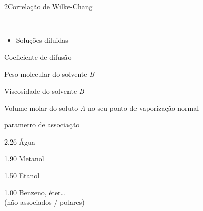 \documentclass[\mainfilename]{subfiles}
\begin{document}
\begin{sectionBox}2{Correlação de Wilke-Chang} %
    
    \begin{BM}
        = 
    \end{BM}

    \begin{itemize}
        \item Soluções diluidas
    \end{itemize}
    \begin{description}[
        leftmargin=!,
        labelwidth=\widthof{\(\dim\mu_B=\unit{\centi\poise}=\qty*{0.1}{\centi\pascal.\second}\)} %
    ]
       \item[\(\dim{\mathscr{D}}=\unit{\centi\metre^3/\second}\)] Coeficiente de difusão
       \item[\(\dim{M_B}=\unit{\gram\of{B}/\mole}\)] Peso molecular do solvente \textit{B}
       \item[\(\dim\mu_B=\unit{\centi\poise}=\qty*{0.1}{\centi\pascal.\second}\)] Viscosidade do solvente \textit{B}
       \item[\(\dim{V_{A}}=\unit{\centi\metre^3.\mole^{-1}}\)] Volume molar do soluto \textit{A} no seu ponto de vaporização normal
       \item[\(\dim\Phi_B=0\)] parametro de associação
       \vspace{-2ex}
       \begin{itemize}
            \begin{multicols}{2}
                \item 2.26 \to{} Água
                \item 1.90 \to{} Metanol
                \item 1.50 \to{} Etanol
                \item 1.00 \to{} Benzeno, éter\dots\\(não associados / polares)
            \end{multicols}
       \end{itemize}
    \end{description}
    
\end{sectionBox}
\end{document}
